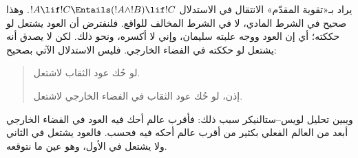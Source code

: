 \documentclass[../../../include/open-logic-section]{subfiles}
\begin{document}


يراد بـ«تقوية المقدّم» الانتقال في الاستدلال
$!A \lif !C \Entails (!A \land !B) \lif !C$. وهذا صحيح في الشرط
المادي، لا في الشرط المخالف للواقع. فلنفترض أن العود يشتعل لو حككته؛
أي إن العود ووجه علبته سليمان، وإني لا أكسره، ونحو ذلك. لكن لا يصدق
أنه يشتعل لو حككته في الفضاء الخارجي. فليس الاستدلال الآتي بصحيح:
\begin{quote}
  لو حُك عود الثقاب لاشتعل.

  إذن، لو حُك عود الثقاب في الفضاء الخارجي لاشتعل.
\end{quote}

ويبين تحليل لويس--ستالنيكر سبب ذلك: فأقرب عالم أحك فيه العود في الفضاء
الخارجي أبعد من العالم الفعلي بكثير من أقرب عالم أحكه فيه فحسب. فالعود
يشتعل في الثاني ولا يشتعل في الأول، وهو عين ما نتوقعه.
\end{document}
